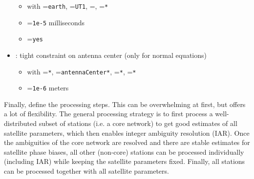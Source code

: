 \begin{itemize}
\begin{itemize}
    \item {} with =\verb|earth|,
          =\verb|UT1|, =\verb||, =\verb|*|
    \item {}=\verb|1e-5| milliseconds
    \item {}=\verb|yes|
  \end{itemize}
  \item {}: tight constraint on antenna center
        (only for normal equations)
  \begin{itemize}
    \item {} with =\verb|*|,
          =\verb|antennaCenter*|, =\verb|*|, =\verb|*|
    \item {}=\verb|1e-6| meters
  \end{itemize}
\end{itemize}

Finally, define the processing steps. This can be overwhelming at first, but offers a lot of flexibility.
The general processing strategy is to first process a well-distributed subset of stations (i.e. a core network)
to get good estimates of all satellite parameters, which then enables integer ambiguity resolution (IAR). Once
the ambiguities of the core network are resolved and there are stable estimates for satellite phase biases, all
other (non-core) stations can be processed individually (including IAR) while keeping the satellite parameters fixed.
Finally, all stations can be processed together with all satellite parameters.

